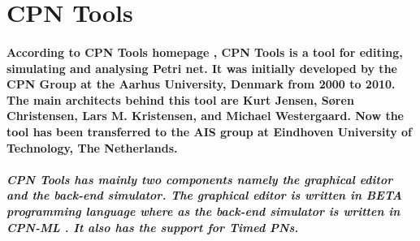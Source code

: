 \section{CPN Tools}
\label{sec:app_comp_tools_CPN_Tools}
\paragraph*{\textnormal{According to CPN Tools homepage \cite{CPN_Tools}, CPN Tools is a tool for editing, simulating and analysing Petri net. It was initially developed by the CPN Group at the Aarhus University, Denmark from 2000 to 2010. The main architects behind this tool are Kurt Jensen, S\o ren Christensen, Lars M. Kristensen, and Michael Westergaard. Now the tool has been transferred to the AIS group at Eindhoven University of Technology, The Netherlands.}}

\subparagraph*{\textnormal{CPN Tools has mainly two components namely the graphical editor and the back-end simulator. The graphical editor is written in BETA programming language where as the back-end simulator is written in CPN-ML \cite{CPN_Tools_Extension}. It also has the support for Timed PNs.}}

